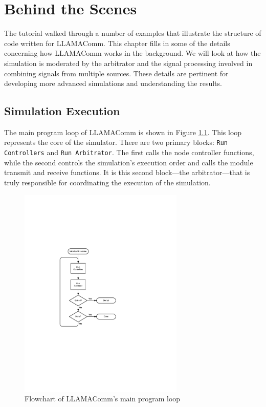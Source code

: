 \chapter{Behind the Scenes}

The tutorial walked through a number of examples that illustrate the
structure of code written for LLAMAComm.  This chapter fills in some
of the details concerning how LLAMAComm works in the background.  We
will look at how the simulation is moderated by the arbitrator and
the signal processing involved in combining signals from multiple
sources.  These details are pertinent for developing more advanced
simulations and understanding the results.

\section{Simulation Execution}\label{sec:simExecution}

The main program loop of LLAMAComm is shown in Figure
\ref{fig:mainLoop}. This loop represents the core of the simulator.
There are two primary blocks: \verb+Run Controllers+ and
\verb+Run Arbitrator+. The first calls the node controller functions, while
the second controls the simulation's execution order and calls the
module transmit and receive functions.  It is this second
block---the arbitrator---that is truly responsible for coordinating
the execution of the simulation.

\begin{figure}[h]
\centering
\includegraphics[height=4in]{"figs/Main Loop Flowchart"}
\caption{Flowchart of LLAMAComm's main program loop}
\label{fig:mainLoop}
\end{figure}

